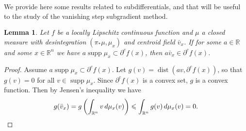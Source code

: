 \documentclass[11pt]{article}
\newtheorem{lem}[thm]{Lemma}
\theoremstyle{definition}
\theoremstyle{remark}
\DeclareMathOperator{\supp}{supp}
\DeclareMathOperator{\dist}{dist}
\newcommand{\R}{\mathbb{R}}
\renewcommand{\leq}{\leqslant}
\begin{document}
We provide here some results related to subdifferentials, and that will be useful to the study of the vanishing step subgradient method.
\begin{lem}\label{lem:centroidclarke} Let $f$ be a locally Lipschitz continuous function and $\mu$ a closed measure with desintegration $(\pi_*\mu,\mu_x)$ and centroid field  $\bar v_x$. 
 If for some $a\in\R$ and some $x\in\R^n$ we have $a\supp\mu_x\subset \partial^cf(x)$, then $a\bar v_x\in\partial^cf(x)$. 
%
\end{lem}
\begin{proof}
 Assume $a\supp\mu_x\subset \partial^cf(x)$.
 Let $g(v)=\dist(av,\partial^cf(x))$, so that $g(v)=0$ for all $v\in\supp\mu_x$. Since $\partial^cf(x)$ is a convex set, $g$ is a convex function. Then by Jensen's inequality we have
 \[g(\bar v_x)=g\left(\int_{\R^n} v\,d\mu_x(v)\right)\leq \int_{\R^n} g(v)\,d\mu_x(v)=0.\qedhere\]
\end{proof}
\end{document}
